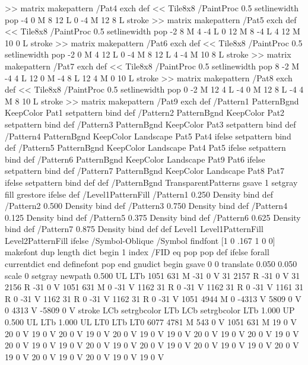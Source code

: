 {{{>> matrix makepattern
/Pat4 exch def
<< Tile8x8
 /PaintProc {0.5 setlinewidth pop -4 0 M 8 12 L
	0 -4 M 12 8 L stroke}
>> matrix makepattern
/Pat5 exch def
<< Tile8x8
 /PaintProc {0.5 setlinewidth pop -2 8 M 4 -4 L
	0 12 M 8 -4 L 4 12 M 10 0 L stroke}
>> matrix makepattern
/Pat6 exch def
<< Tile8x8
 /PaintProc {0.5 setlinewidth pop -2 0 M 4 12 L
	0 -4 M 8 12 L 4 -4 M 10 8 L stroke}
>> matrix makepattern
/Pat7 exch def
<< Tile8x8
 /PaintProc {0.5 setlinewidth pop 8 -2 M -4 4 L
	12 0 M -4 8 L 12 4 M 0 10 L stroke}
>> matrix makepattern
/Pat8 exch def
<< Tile8x8
 /PaintProc {0.5 setlinewidth pop 0 -2 M 12 4 L
	-4 0 M 12 8 L -4 4 M 8 10 L stroke}
>> matrix makepattern
/Pat9 exch def
/Pattern1 {PatternBgnd KeepColor Pat1 setpattern} bind def
/Pattern2 {PatternBgnd KeepColor Pat2 setpattern} bind def
/Pattern3 {PatternBgnd KeepColor Pat3 setpattern} bind def
/Pattern4 {PatternBgnd KeepColor Landscape {Pat5} {Pat4} ifelse setpattern} bind def
/Pattern5 {PatternBgnd KeepColor Landscape {Pat4} {Pat5} ifelse setpattern} bind def
/Pattern6 {PatternBgnd KeepColor Landscape {Pat9} {Pat6} ifelse setpattern} bind def
/Pattern7 {PatternBgnd KeepColor Landscape {Pat8} {Pat7} ifelse setpattern} bind def
} def
%
%
%
/PatternBgnd {
  TransparentPatterns {} {gsave 1 setgray fill grestore} ifelse
} def
%
%
/Level1PatternFill {
/Pattern1 {0.250 Density} bind def
/Pattern2 {0.500 Density} bind def
/Pattern3 {0.750 Density} bind def
/Pattern4 {0.125 Density} bind def
/Pattern5 {0.375 Density} bind def
/Pattern6 {0.625 Density} bind def
/Pattern7 {0.875 Density} bind def
} def
%
%
Level1 {Level1PatternFill} {Level2PatternFill} ifelse
%
/Symbol-Oblique /Symbol findfont [1 0 .167 1 0 0] makefont
dup length dict begin {1 index /FID eq {pop pop} {def} ifelse} forall
currentdict end definefont pop
end
gnudict begin
gsave
0 0 translate
0.050 0.050 scale
0 setgray
newpath
0.500 UL
LTb
1051 631 M
-31 0 V
31 2157 R
-31 0 V
31 2156 R
-31 0 V
1051 631 M
0 -31 V
1162 31 R
0 -31 V
1162 31 R
0 -31 V
1161 31 R
0 -31 V
1162 31 R
0 -31 V
1162 31 R
0 -31 V
1051 4944 M
0 -4313 V
5809 0 V
0 4313 V
-5809 0 V
stroke
LCb setrgbcolor
LTb
LCb setrgbcolor
LTb
1.000 UP
0.500 UL
LTb
1.000 UL
LT0
LTb
LT0
6077 4781 M
543 0 V
1051 631 M
19 0 V
20 0 V
19 0 V
20 0 V
19 0 V
20 0 V
19 0 V
19 0 V
20 0 V
19 0 V
20 0 V
19 0 V
20 0 V
19 0 V
19 0 V
20 0 V
19 0 V
20 0 V
19 0 V
20 0 V
19 0 V
19 0 V
20 0 V
19 0 V
20 0 V
19 0 V
20 0 V
19 0 V
19 0 V
}}
